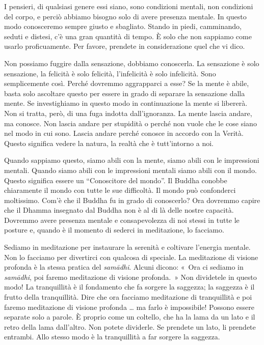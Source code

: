 I pensieri, di qualsiasi genere essi siano, sono condizioni mentali, non
condizioni del corpo, e perciò abbiamo bisogno solo di avere presenza
mentale. In questo modo conosceremo sempre giusto e sbagliato. Stando in
piedi, camminando, seduti e distesi, c'è una gran quantità di tempo. È
solo che non sappiamo come usarlo proficuamente. Per favore, prendete in
considerazione quel che vi dico.

Non possiamo fuggire dalla sensazione, dobbiamo conoscerla. La
sensazione è solo sensazione, la felicità è solo felicità, l'infelicità
è solo infelicità. Sono semplicemente così. Perché dovremmo aggrapparci
a esse? Se la mente è abile, basta solo ascoltare questo per essere in
grado di separare la sensazione dalla mente. Se investighiamo in questo
modo in continuazione la mente si libererà. Non si tratta, però, di una
fuga indotta dall'ignoranza. La mente lascia andare, ma conosce. Non
lascia andare per stupidità o perché non vuole che le cose siano nel
modo in cui sono. Lascia andare perché conosce in accordo con la Verità.
Questo significa vedere la natura, la realtà che è tutt'intorno a noi.

Quando sappiamo questo, siamo abili con la mente, siamo abili con le
impressioni mentali. Quando siamo abili con le impressioni mentali siamo
abili con il mondo. Questo significa essere un ``Conoscitore del
mondo''. Il Buddha conobbe chiaramente il mondo con tutte le sue
difficoltà. Il mondo può confonderci moltissimo. Com'è che il Buddha fu
in grado di conoscerlo? Ora dovremmo capire che il Dhamma insegnato dal
Buddha non è al di là delle nostre capacità. Dovremmo avere presenza
mentale e consapevolezza di noi stessi in tutte le posture e, quando è
il momento di sederci in meditazione, lo facciamo.

Sediamo in meditazione per instaurare la serenità e coltivare l'energia
mentale. Non lo facciamo per divertirci con qualcosa di speciale. La
meditazione di visione profonda è la stessa pratica del \emph{samādhi}.
Alcuni dicono: «~Ora ci sediamo in \emph{samādhi}, poi faremo
meditazione di visione profonda.~» Non dividetele in questo modo! La
tranquillità è il fondamento che fa sorgere la saggezza; la saggezza è
il frutto della tranquillità. Dire che ora facciamo meditazione di
tranquillità e poi faremo meditazione di visione profonda \ldots{} ma farlo è
impossibile! Possono essere separate solo a parole. È proprio come un
coltello, che ha la lama da un lato e il retro della lama dall'altro.
Non potete dividerle. Se prendete un lato, li prendete entrambi. Allo
stesso modo è la tranquillità a far sorgere la saggezza.

